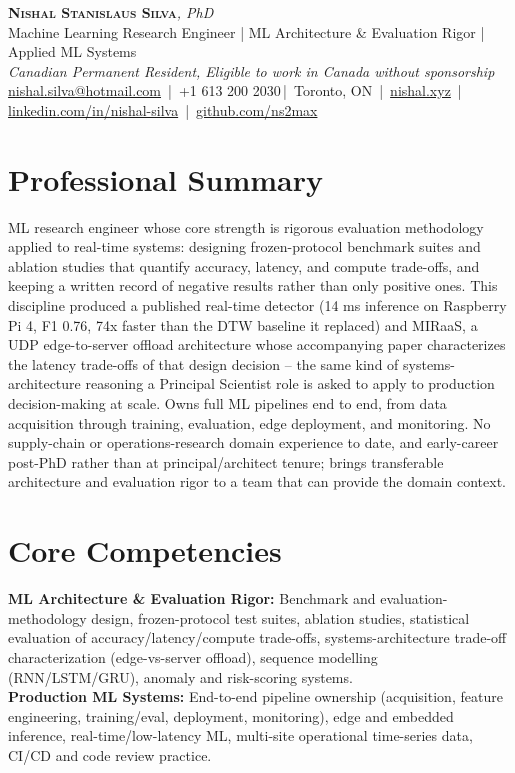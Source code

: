 \documentclass[11pt]{article}
\makeatletter
\newcommand{\cvName}{Nishal Stanislaus Silva}
\newcommand{\cvEmail}{nishal.silva@hotmail.com}
\newcommand{\cvPhone}{+1 613 200 2030}
\newcommand{\cvCity}{Toronto, ON}
\newcommand{\cvSite}{https://nishal.xyz}
\newcommand{\cvLinkedIn}{https://www.linkedin.com/in/nishal-silva}
\newcommand{\cvGitHub}{https://github.com/ns2max}
\newcommand{\cvStatus}{Canadian Permanent Resident, Eligible to work in Canada without sponsorship}
\newcommand{\cvTagline}{Machine Learning Research Engineer | ML Architecture \& Evaluation Rigor | Applied ML Systems}
\makeatother
\begin{document}
\pagestyle{empty}
\begin{center}
    {\LARGE \scshape \textbf{\cvName}}{\large \textit{, PhD}}\\[1pt]
    {\small \cvTagline}\\[1pt]
    {\footnotesize\textit{\cvStatus}}\\[1pt]
    {\small
    \href{mailto:\cvEmail}{\cvEmail} \,|\, \cvPhone \,|\, \cvCity
    \,|\, \href{\cvSite}{nishal.xyz} \,|\, \href{\cvLinkedIn}{linkedin.com/in/nishal-silva}
    \,|\, \href{\cvGitHub}{github.com/ns2max}}
\end{center}

\section*{Professional Summary}
ML research engineer whose core strength is rigorous evaluation methodology applied to real-time systems: designing frozen-protocol benchmark suites and ablation studies that quantify accuracy, latency, and compute trade-offs, and keeping a written record of negative results rather than only positive ones. This discipline produced a published real-time detector (14 ms inference on Raspberry Pi 4, F1 0.76, 74x faster than the DTW baseline it replaced) and MIRaaS, a UDP edge-to-server offload architecture whose accompanying paper characterizes the latency trade-offs of that design decision -- the same kind of systems-architecture reasoning a Principal Scientist role is asked to apply to production decision-making at scale. Owns full ML pipelines end to end, from data acquisition through training, evaluation, edge deployment, and monitoring. No supply-chain or operations-research domain experience to date, and early-career post-PhD rather than at principal/architect tenure; brings transferable architecture and evaluation rigor to a team that can provide the domain context.

\section*{Core Competencies}
\textbf{ML Architecture \& Evaluation Rigor:} Benchmark and evaluation-methodology design, frozen-protocol test suites, ablation studies, statistical evaluation of accuracy/latency/compute trade-offs, systems-architecture trade-off characterization (edge-vs-server offload), sequence modelling (RNN/LSTM/GRU), anomaly and risk-scoring systems.\\[2pt]
\textbf{Production ML Systems:} End-to-end pipeline ownership (acquisition, feature engineering, training/eval, deployment, monitoring), edge and embedded inference, real-time/low-latency ML, multi-site operational time-series data, CI/CD and code review practice.
\end{document}
